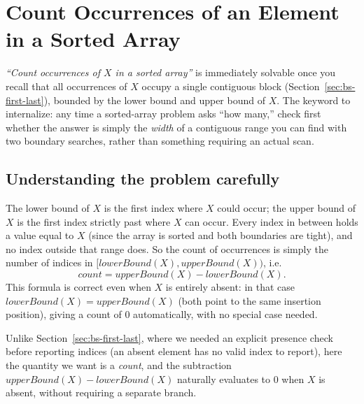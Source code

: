 \section{Count Occurrences of an Element in a Sorted Array}
\label{sec:bs-count-occurrences}


\begin{patternbox}
\emph{``Count occurrences of $X$ in a sorted array''} is immediately
solvable once you recall that all occurrences of $X$ occupy a single
contiguous block (Section~\ref{sec:bs-first-last}), bounded by the lower
bound and upper bound of $X$. The keyword to internalize: any time a
sorted-array problem asks ``how many,'' check first whether the answer is
simply the \emph{width} of a contiguous range you can find with two
boundary searches, rather than something requiring an actual scan.
\end{patternbox}

\subsection*{Understanding the problem carefully}

The lower bound of $X$ is the first index where $X$ could occur; the upper
bound of $X$ is the first index strictly past where $X$ can occur. Every
index in between holds a value equal to $X$ (since the array is sorted and
both boundaries are tight), and no index outside that range does. So the
count of occurrences is simply the number of indices in
$[\textit{lowerBound}(X), \textit{upperBound}(X))$, i.e.
\[
  \textit{count} = \textit{upperBound}(X) - \textit{lowerBound}(X).
\]
This formula is correct even when $X$ is entirely absent: in that case
$\textit{lowerBound}(X) = \textit{upperBound}(X)$ (both point to the same
insertion position), giving a count of $0$ automatically, with no special
case needed.

\begin{ideabox}
Unlike Section~\ref{sec:bs-first-last}, where we needed an explicit
presence check before reporting indices (an absent element has no valid
index to report), here the quantity we want is a \emph{count}, and the
subtraction $\textit{upperBound}(X) - \textit{lowerBound}(X)$ naturally
evaluates to $0$ when $X$ is absent, without requiring a separate branch.
\end{ideabox}

